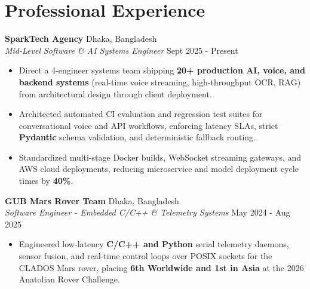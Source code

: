 \documentclass[9.5pt,a4paper]{article}
\begin{document}
\section*{Professional Experience}
\noindent
\textbf{SparkTech Agency} \hfill Dhaka, Bangladesh\\
\textit{Mid-Level Software \& AI Systems Engineer} \hfill Sept 2025 - Present
\begin{itemize}
    \item Direct a 4-engineer systems team shipping \textbf{20+ production AI, voice, and backend systems} (real-time voice streaming, high-throughput OCR, RAG) from architectural design through client deployment.
    \item Architected automated CI evaluation and regression test suites for conversational voice and API workflows, enforcing latency SLAs, strict \textbf{Pydantic} schema validation, and deterministic fallback routing.
    \item Standardized multi-stage Docker builds, WebSocket streaming gateways, and AWS cloud deployments, reducing microservice and model deployment cycle times by \textbf{40\%}.
\end{itemize}
\vspace{0.6pt}
\noindent
\textbf{GUB Mars Rover Team} \hfill Dhaka, Bangladesh\\
\textit{Software Engineer - Embedded C/C++ \& Telemetry Systems} \hfill May 2024 - Aug 2025
\begin{itemize}
    \item Engineered low-latency \textbf{C/C++ and Python} serial telemetry daemons, sensor fusion, and real-time control loops over POSIX sockets for the CLADOS Mars rover, placing \textbf{6th Worldwide and 1st in Asia} at the 2026 Anatolian Rover Challenge.
\end{itemize}
\vspace{0.6pt}
\end{document}
